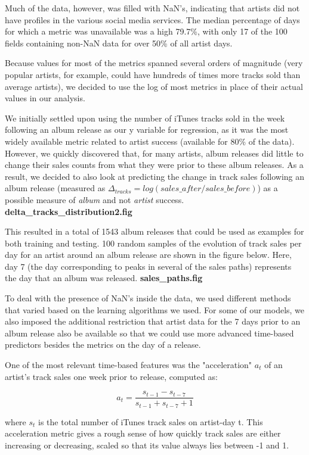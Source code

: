 \documentclass[conference]{IEEEtran}
\begin{document}
Much of the data, however, was filled with NaN's, indicating that artists did not have profiles in the various social media services. The median percentage of days for which a metric was unavailable was a high 79.7\%, with only 17 of the 100 fields containing non-NaN data for over 50\% of all artist days.

Because values for most of the metrics spanned several orders of magnitude (very popular artists, for example, could have hundreds of times more tracks sold than average artists), we decided to use the log of most metrics in place of their actual values in our analysis.

We initially settled upon using the number of iTunes tracks sold in the week following an album release as our y variable for regression, as it was the most widely available metric related to artist success (available for 80\% of the data). However, we quickly discovered that, for many artists, album releases did little to change their sales counts from what they were prior to these album releases. As a result, we decided to also look at predicting the change in track sales following an album release (measured as $\Delta_{tracks} = log(sales\_after/sales\_before)$) as a possible measure of \textit{album} and not \textit{artist} success. \textbf{delta\_tracks\_distribution2.fig}

This resulted in a total of 1543 album releases that could be used as examples for both training and testing. 100 random samples of the evolution of track sales per day for an artist around an album release are shown in the figure below. Here, day 7 (the day corresponding to peaks in several of the sales paths) represents the day that an album was released. \textbf{sales\_paths.fig}

To deal with the presence of NaN's inside the data, we used different methods that varied based on the learning algorithms we used. For some of our models, we also imposed the additional restriction that artist data for the 7 days prior to an album release also be available so that we could use more advanced time-based predictors besides the metrics on the day of a release.

One of the most relevant time-based features was the "acceleration" $a_t$ of an artist's track sales one week prior to release, computed as:

$$a_t = \frac{s_{t-1} - s_{t-7}}{s_{t-1} + s_{t-7} + 1}$$

where $s_t$ is the total number of iTunes track sales on artist-day t. This acceleration metric gives a rough sense of how quickly track sales are either increasing or decreasing, scaled so that its value always lies between -1 and 1.
\end{document}
